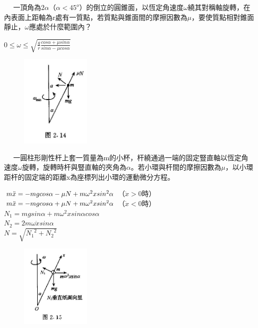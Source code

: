 \documentclass[cn,10pt,math=newtx,chinesefont=founder]{../elegantbook}
\begin{document}
\newpage


\begin{example}　
    一頂角為$2\alpha$（$\alpha < 45^o$）的倒立的圓錐面，以恆定角速度$\omega$繞其對稱軸旋轉，在內表面上距軸為r處有一質點，若質點與錐面間的摩擦因數為$\mu$，要使質點相對錐面靜止，$\omega$應處於什麼範圍內？
    
    \rightline{[2.1.21]}
\end{example}

\begin{solution}
$0 \leq \omega \leq \sqrt{\frac{g}{r}\frac{cos\alpha+\mu sin\alpha}{sin\alpha-\mu cos\alpha}}$
\end{solution}

\begin{figure}[htbp]
\flushright
\includegraphics[width=0.3\textwidth]{image/2.14.JPG}
\end{figure}

\newpage


\begin{example}　
    一圓柱形剛性杆上套一質量為m的小杯，杆繞通過一端的固定豎直軸以恆定角速度$\omega$旋轉，旋轉時杆與豎直軸的夾角為$\alpha$。若小環與杆間的摩擦因數為$\mu$，以小環距杆的固定端的距離x為座標列出小環的運動微分方程。
    
    \rightline{[2.1.22]}
\end{example}

\begin{solution}
$m\Ddot{x} = -mgcos\alpha - \mu N + m\omega^2xsin^2\alpha$ （$\Dot{x}>0$時）\\
$m\Ddot{x} = -mgcos\alpha + \mu N + m\omega^2xsin^2\alpha$ （$\Dot{x}<0$時）\\
$N_1 = mgsin\alpha + m\omega^2xsin\alpha cos\alpha$\\
$N_2 = 2m\omega \Dot{x}sin\alpha$\\
$N = \sqrt{{N_1}^2 + {N_2}^2}$
\end{solution}

\begin{figure}[htbp]
\flushright
\includegraphics[width=0.3\textwidth]{image/2.15.JPG}
\end{figure}
\end{document}
